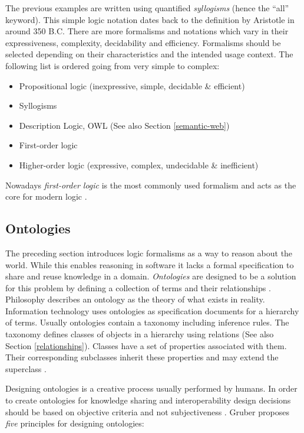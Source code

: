The previous examples are written using quantified \textit{syllogisms} (hence the \enquote{all} keyword). This simple logic notation dates back to the definition by Aristotle in around 350 B.C.
There are more formalisms and notations which vary in their expressiveness, complexity, decidability and efficiency.
Formalisms should be selected depending on their characteristics and the intended usage context.
The following list is ordered going from very simple to complex:

\begin{itemize}
\item Propositional logic (inexpressive, simple, decidable \& efficient)
\item Syllogisms
\item Description Logic, OWL (See also Section \ref{semantic-web})
\item First-order logic
\item Higher-order logic (expressive, complex, undecidable \& inefficient)
\end{itemize}

Nowadays \textit{first-order logic} is the most commonly used formalism and acts as the core for modern logic \cite{Ferreiros2001a}.

\subsection{Ontologies} \label{ontologies}
The preceding section introduces logic formalisms as a way to reason about the world.
While this enables reasoning in software it lacks a formal specification to share and reuse knowledge in a domain.
\textit{Ontologies} are designed to be a solution for this problem by defining a collection of terms and their relationships \cite{Berners-lee2002b}.
Philosophy describes an ontology as the theory of what exists in reality.
Information technology uses ontologies as specification documents for a hierarchy of terms.
Usually ontologies contain a taxonomy including inference rules.
The taxonomy defines classes of objects in a hierarchy using relations (See also Section \ref{relationships}).
Classes have a set of properties associated with them.
Their corresponding subclasses inherit these properties and may extend the superclass \cite{Berners-lee2002b}.

Designing ontologies is a creative process usually performed by humans.
In order to create ontologies for knowledge sharing and interoperability design decisions should be based on objective criteria and not subjectiveness \cite{Gruber1995b}.
Gruber \cite{Gruber1995b} proposes \textit{five} principles for designing ontologies:

